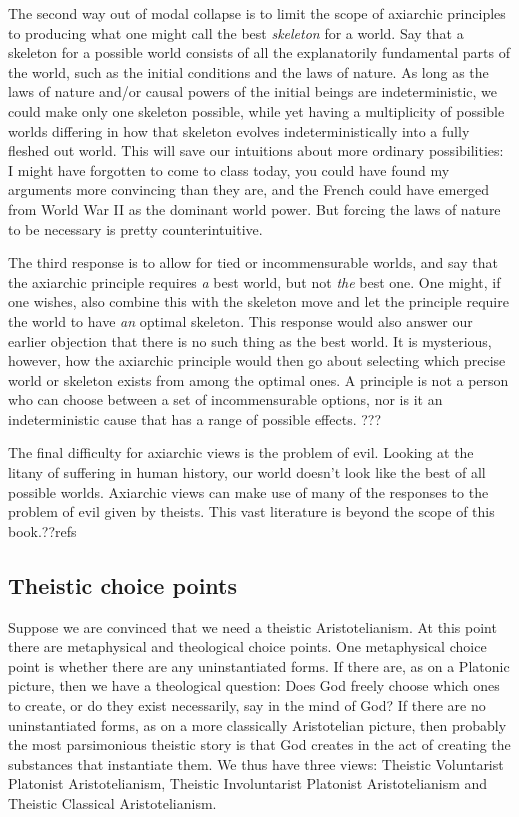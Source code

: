 The second way out of modal collapse is to limit the scope of axiarchic principles to producing what one might call the best 
\textit{skeleton} for a world. Say that a skeleton for a possible world consists of all the explanatorily fundamental parts
of the world, such as the initial conditions and the laws of nature. As long as the laws of nature and/or causal powers of 
the initial beings are indeterministic, we could make only one skeleton possible, while yet having a multiplicity of possible 
worlds differing in how that skeleton evolves indeterministically into a fully fleshed out world. This will save our intuitions
about more ordinary possibilities: I might have forgotten to come to class today, you could have found my arguments more convincing
than they are, and the French could have emerged from World War II as the dominant world power. But forcing the laws of nature to 
be necessary is pretty counterintuitive. 

The third response is to allow for tied or incommensurable worlds, and say that the axiarchic principle requires \textit{a} best world,
but not \textit{the} best one. One might, if one wishes, also combine this with the skeleton move and let the principle require the world
to have \textit{an} optimal skeleton. This response would also answer our earlier objection that there is no such thing as the best world.
It is mysterious, however, how the axiarchic principle would then go about selecting which precise world or skeleton exists from among the
optimal ones. A principle is not a person who can choose between a set of incommensurable options, nor is it an indeterministic cause that
has a range of possible effects. ???

The final difficulty for axiarchic views is the problem of evil. Looking at the litany of suffering in human history, 
our world doesn't look like the best of all possible worlds. Axiarchic views can make use of many of the responses to 
the problem of evil given by theists. This vast literature is beyond the scope of this book.??refs

\subsection{Theistic choice points}
Suppose we are convinced that we need a theistic Aristotelianism.
At this point there are metaphysical and theological choice points. One metaphysical choice point is whether there are any
uninstantiated forms. If there are, as on a Platonic picture, then we have a theological question: Does God freely choose which ones
to create, or do they exist necessarily, say in the mind of God? If there are no uninstantiated forms, as on a more classically 
Aristotelian picture, then probably the most parsimonious theistic story is that God creates in the act of creating the substances 
that instantiate them. We thus have three views: Theistic Voluntarist Platonist Aristotelianism, Theistic Involuntarist Platonist Aristotelianism
and Theistic Classical Aristotelianism.

